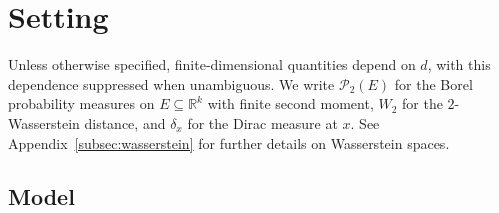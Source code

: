 \section{Setting}
\label{sec:setting}

Unless otherwise specified, finite-dimensional quantities depend
on $d$, with this dependence suppressed when unambiguous.
We write $\mathscr P_2(E)$ for the Borel probability measures on
$E\subseteq\mathbb R^k$ with finite second moment, $W_2$ for the
$2$-Wasserstein distance, and $\delta_x$ for the Dirac measure at $x$.
See Appendix~\ref{subsec:wasserstein} for further details on Wasserstein spaces.

\subsection{Model}

